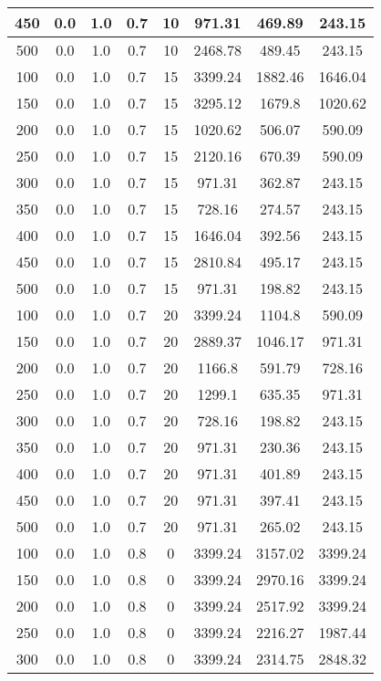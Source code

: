 \documentclass[a4paper, 12pt]{extreport}
\begin{document}
\begin{itemize}
\begin{longtable}{|c|c|c|c|c|c|c|c|}
			450 & 0.0 & 1.0 & 0.7 & 10 & 971.31 & 469.89 & 243.15 \\\hline
			500 & 0.0 & 1.0 & 0.7 & 10 & 2468.78 & 489.45 & 243.15 \\\hline
			100 & 0.0 & 1.0 & 0.7 & 15 & 3399.24 & 1882.46 & 1646.04 \\\hline
			150 & 0.0 & 1.0 & 0.7 & 15 & 3295.12 & 1679.8 & 1020.62 \\\hline
			200 & 0.0 & 1.0 & 0.7 & 15 & 1020.62 & 506.07 & 590.09 \\\hline
			250 & 0.0 & 1.0 & 0.7 & 15 & 2120.16 & 670.39 & 590.09 \\\hline
			300 & 0.0 & 1.0 & 0.7 & 15 & 971.31 & 362.87 & 243.15 \\\hline
			350 & 0.0 & 1.0 & 0.7 & 15 & 728.16 & 274.57 & 243.15 \\\hline
			400 & 0.0 & 1.0 & 0.7 & 15 & 1646.04 & 392.56 & 243.15 \\\hline
			450 & 0.0 & 1.0 & 0.7 & 15 & 2810.84 & 495.17 & 243.15 \\\hline
			500 & 0.0 & 1.0 & 0.7 & 15 & 971.31 & 198.82 & 243.15 \\\hline
			100 & 0.0 & 1.0 & 0.7 & 20 & 3399.24 & 1104.8 & 590.09 \\\hline
			150 & 0.0 & 1.0 & 0.7 & 20 & 2889.37 & 1046.17 & 971.31 \\\hline
			200 & 0.0 & 1.0 & 0.7 & 20 & 1166.8 & 591.79 & 728.16 \\\hline
			250 & 0.0 & 1.0 & 0.7 & 20 & 1299.1 & 635.35 & 971.31 \\\hline
			300 & 0.0 & 1.0 & 0.7 & 20 & 728.16 & 198.82 & 243.15 \\\hline
			350 & 0.0 & 1.0 & 0.7 & 20 & 971.31 & 230.36 & 243.15 \\\hline
			400 & 0.0 & 1.0 & 0.7 & 20 & 971.31 & 401.89 & 243.15 \\\hline
			450 & 0.0 & 1.0 & 0.7 & 20 & 971.31 & 397.41 & 243.15 \\\hline
			500 & 0.0 & 1.0 & 0.7 & 20 & 971.31 & 265.02 & 243.15 \\\hline
			100 & 0.0 & 1.0 & 0.8 & 0 & 3399.24 & 3157.02 & 3399.24 \\\hline
			150 & 0.0 & 1.0 & 0.8 & 0 & 3399.24 & 2970.16 & 3399.24 \\\hline
			200 & 0.0 & 1.0 & 0.8 & 0 & 3399.24 & 2517.92 & 3399.24 \\\hline
			250 & 0.0 & 1.0 & 0.8 & 0 & 3399.24 & 2216.27 & 1987.44 \\\hline
			300 & 0.0 & 1.0 & 0.8 & 0 & 3399.24 & 2314.75 & 2848.32 \\\hline

\end{longtable}
\end{itemize}
\end{document}
